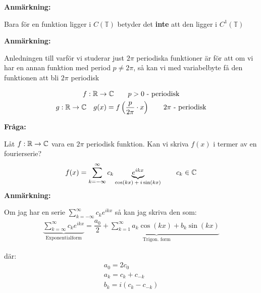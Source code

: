 \par\bigskip
\noindent\textbf{Anmärkning:}\par
\noindent Bara för en funktion ligger i $C(\mathbb{T})$ betyder det \textbf{inte} att den ligger i $C^1(\mathbb{T})$
\par\bigskip
\noindent\textbf{Anmärkning:}\par
\noindent Anledningen till varför vi studerar just $2\pi$ periodiska funktioner är för att om vi har en annan funktion med period $p\neq 2\pi$, så kan vi med variabelbyte få den funktionen att bli $2\pi$ periodisk 
\par\bigskip
\begin{equation*}
  \begin{gathered}
    f:\mathbb{R}\to\mathbb{C}\qquad p>0\text{ - periodisk}\\
    g:\mathbb{R}\to\mathbb{C}\quad g(x) = f\left(\dfrac{p}{2\pi}\cdot x\right)\qquad2\pi\text{ - periodisk}
  \end{gathered}
\end{equation*}
\par\bigskip
\noindent\textbf{Fråga:}\par
\noindent Låt $f:\mathbb{R}\to\mathbb{C}$ vara en $2\pi$ periodisk funktion. Kan vi skriva $f(x)$ i termer av en fourierserie?
\begin{equation*}
  \begin{gathered}
    f(x) = \sum_{k=-\infty}^{\infty}c_k\underbrace{e^{ikx}}_{\text{$\cos(kx)+i\sin(kx)$}}\qquad c_k\in\mathbb{C}
  \end{gathered}
\end{equation*}
\newpage
\noindent\textbf{Anmärkning:}\par
\noindent Om jag har en serie $\sum_{k=-\infty}^{\infty}c_ke^{ikx}$ så kan jag skriva den som:
\begin{equation*}
  \begin{gathered}
    \underbrace{\sum_{k=\infty}^{\infty}c_ke^{ikx}}_{\text{Exponentialform}}= \underbrace{\dfrac{a_0}{2} + \sum_{k=1}^{\infty}a_k\cos(kx)+b_k\sin(kx)}_{\text{Trigon. form}}
  \end{gathered}
\end{equation*}\par
\noindent där:
\begin{equation*}
  \begin{gathered}
    a_0 = 2c_0\\
    a_k = c_k+c_{-k}\\
    b_k = i(c_k-c_{-k})
  \end{gathered}
\end{equation*}\par
